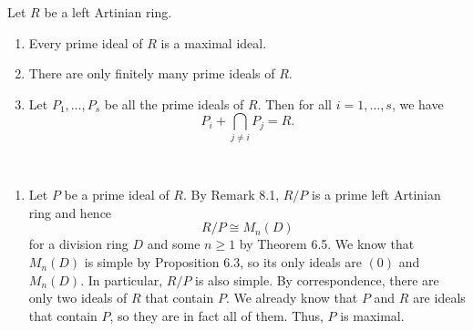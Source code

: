 \begin{lemma}
Let $R$ be a left Artinian ring. 
\begin{enumerate}[(1)]
    \item Every prime ideal of $R$ is a maximal ideal. 
    \item There are only finitely many prime ideals of $R$. 
    \item Let $P_1, \dots, P_s$ be all the prime ideals of $R$. Then for all $i = 1, \dots, s$, we have 
    \[ P_i + \bigcap_{j \neq i} P_j = R. \]
\end{enumerate}
\end{lemma}
\begin{pf}~
\begin{enumerate}[(1)]
    \item Let $P$ be a prime ideal of $R$. By Remark 8.1, $R/P$ is a prime left Artinian ring 
    and hence 
    \[ R/P \cong M_n(D) \]
    for a division ring $D$ and some $n \geq 1$ by Theorem 6.5. We know that $M_n(D)$ is simple by 
    Proposition 6.3, so its only ideals are $(0)$ and $M_n(D)$. In particular, $R/P$ is also simple. 
    By correspondence, there are only two ideals of $R$ that contain $P$. We already know that 
    $P$ and $R$ are ideals that contain $P$, so they are in fact all of them. Thus, $P$ is 
    maximal. 
    

\end{enumerate}
\end{pf}
